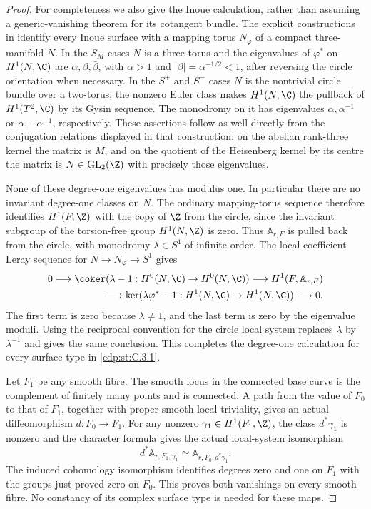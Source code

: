 \begin{proof}
For completeness we also give the Inoue calculation, rather than assuming a generic-vanishing theorem for its cotangent bundle. The explicit constructions in \cite[\S2.1.2 and Proposition~2.3]{Albanese2020} identify every Inoue surface with a mapping torus $N_\varphi$ of a compact three-manifold $N$. In the $S_M$ cases $N$ is a three-torus and the eigenvalues of $\varphi^*$ on $H^1(N,\C)$ are $\alpha,\beta,\bar\beta$, with $\alpha>1$ and $|\beta|=\alpha^{-1/2}<1$, after reversing the circle orientation when necessary. In the $S^+$ and $S^-$ cases $N$ is the nontrivial circle bundle over a two-torus; the nonzero Euler class makes $H^1(N,\C)$ the pullback of $H^1(T^2,\C)$ by its Gysin sequence. The monodromy on it has eigenvalues $\alpha,\alpha^{-1}$ or $\alpha,-\alpha^{-1}$, respectively. These assertions follow as well directly from the conjugation relations displayed in that construction: on the abelian rank-three kernel the matrix is $M$, and on the quotient of the Heisenberg kernel by its centre the matrix is $N\in\mathrm{GL}_2(\Z)$ with precisely those eigenvalues.

None of these degree-one eigenvalues has modulus one. In particular there are no invariant degree-one classes on $N$. The ordinary mapping-torus sequence therefore identifies $H^1(F,\Z)$ with the copy of $\Z$ from the circle, since the invariant subgroup of the torsion-free group $H^1(N,\Z)$ is zero. Thus $\mathbb A_{r,F}$ is pulled back from the circle, with monodromy $\lambda\in S^1$ of infinite order. The local-coefficient Leray sequence for $N\to N_\varphi\to S^1$ gives
\[
\begin{split}
0\longrightarrow
 \coker(\lambda-1:H^0(N,\C)\to H^0(N,\C))
 \longrightarrow H^1(F,\mathbb A_{r,F})\\
 \longrightarrow
 \ker(\lambda\varphi^*-1:H^1(N,\C)\to H^1(N,\C))
 \longrightarrow0.
\end{split}
\]
The first term is zero because $\lambda\ne1$, and the last term is zero by the eigenvalue moduli. Using the reciprocal convention for the circle local system replaces $\lambda$ by $\lambda^{-1}$ and gives the same conclusion. This completes the degree-one calculation for every surface type in \ref{cdp:st:C.3.1}.

Let $F_1$ be any smooth fibre. The smooth locus in the connected base curve is the complement of finitely many points and is connected. A path from the value of $F_0$ to that of $F_1$, together with proper smooth local triviality, gives an actual diffeomorphism $d:F_0\to F_1$. For any nonzero $\gamma_1\in H^1(F_1,\Z)$, the class $d^*\gamma_1$ is nonzero and the character formula gives the actual local-system isomorphism
\[
 d^*\mathbb A_{r,F_1,\gamma_1}
       \simeq\mathbb A_{r,F_0,d^*\gamma_1}.
\]
The induced cohomology isomorphism identifies degrees zero and one on $F_1$ with the groups just proved zero on $F_0$. This proves both vanishings on every smooth fibre. No constancy of its complex surface type is needed for these maps.


\end{proof}

